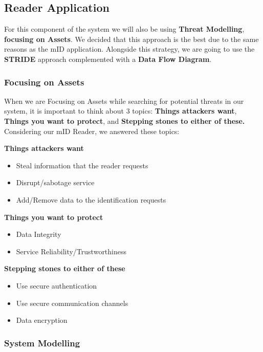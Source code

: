 \subsection{Reader Application}

For this component of the system we will also be using \textbf{Threat Modelling}, \textbf{focusing on Assets}. We decided that this approach is the best due to the same reasons as the mID application. Alongside this strategy, we are going to use the \textbf{STRIDE} approach complemented with a \textbf{Data Flow Diagram}.

\subsubsection{Focusing on Assets}

When we are Focusing on Assets while searching for potential threats in our system, it is important to think about 3 topics: \textbf{Things attackers want}, \textbf{Things you want to protect}, and \textbf{Stepping stones to either of these.} Considering our mID Reader, we answered these topics:

\textbf{Things attackers want}
\begin{itemize}
    \item Steal information that the reader requests
    \item Disrupt/sabotage service
    \item Add/Remove data to the identification requests
\end{itemize}

\textbf{Things you want to protect}
\begin{itemize}
    \item Data Integrity
    \item Service Reliability/Trustworthiness
\end{itemize}

\textbf{Stepping stones to either of these}
\begin{itemize}
    \item Use secure authentication
    \item Use secure communication channels
    \item Data encryption
\end{itemize}

\subsubsection{System Modelling}


